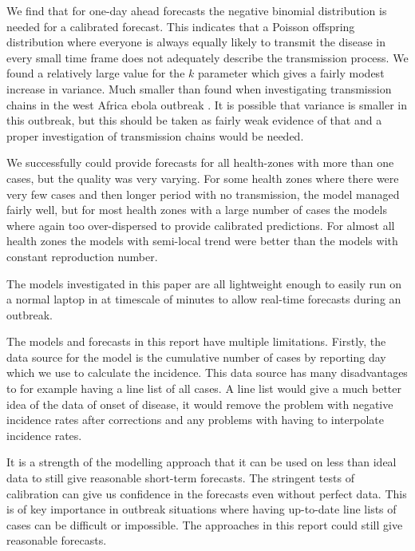 \documentclass[12pt]{article}
\begin{document}
We find that for one-day ahead forecasts the negative binomial distribution is needed for a calibrated forecast. This indicates that a Poisson offspring distribution where everyone is always equally likely to transmit the disease in every small time frame does not adequately describe the transmission process. We found a relatively large value for the $k$ parameter which gives a fairly modest increase in variance. Much smaller than found when investigating transmission chains in the west Africa ebola outbreak \cite{internationalebolaresponseteamExposurePatternsDriving2016}. It is possible that variance is smaller in this outbreak, but this should be taken as fairly weak evidence of that and a proper investigation of transmission chains would be needed. 

We successfully could provide forecasts for all health-zones with more than one cases, but the quality was very varying. For some health zones where there were very few cases and then longer period with no transmission, the model managed fairly well, but for most health zones with a large number of cases the models where again too over-dispersed to provide calibrated predictions. For almost all health zones the models with semi-local trend were better than the models with constant reproduction number. 


The models investigated in this paper are all lightweight enough to easily run on a normal laptop in at timescale of minutes to allow real-time forecasts during an outbreak. 



The models and forecasts in this report have multiple limitations. Firstly, the data source for the model is the cumulative number of cases by reporting day which we use to calculate the incidence. This data source has many disadvantages to for example having a line list of all cases. A line list would give a much better idea of the data of onset of disease, it would remove the problem with negative incidence rates after corrections and any problems with having to interpolate incidence rates.

It is a strength of the modelling approach that it can be used on less than ideal data to still give reasonable short-term forecasts. The stringent tests of calibration can give us confidence in the forecasts even without perfect data. This is of key importance in outbreak situations where having up-to-date line lists of cases can be difficult or impossible. The approaches in this report could still give reasonable forecasts. 
\end{document}
